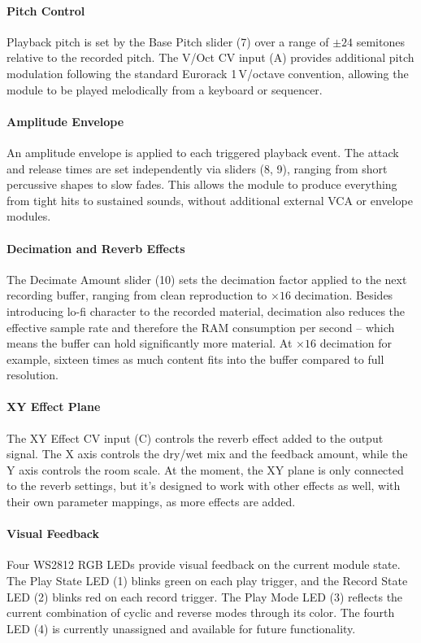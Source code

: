 \paragraph{Pitch Control}
Playback pitch is set by the Base Pitch slider (7) over a range of $\pm24$ semitones relative to the recorded pitch. 
The V/Oct CV input (A) provides additional pitch modulation following the standard Eurorack 1\,V/octave convention, allowing the module to be played melodically from a keyboard or sequencer.

\paragraph{Amplitude Envelope}
An amplitude envelope is applied to each triggered playback event. 
The attack and release times are set independently via sliders (8, 9), ranging from short percussive shapes to slow fades. 
This allows the module to produce everything from tight hits to sustained sounds, without additional external \ac{VCA} or envelope modules.

\paragraph{Decimation and Reverb Effects}
The Decimate Amount slider (10) sets the decimation factor applied to the next recording buffer, ranging from clean reproduction to $\times16$ decimation.
Besides introducing lo-fi character to the recorded material, decimation also reduces the effective sample rate and therefore the RAM consumption per second -- which means the buffer can hold significantly more material. 
At $\times16$ decimation for example, sixteen times as much content fits into the buffer compared to full resolution.

\paragraph{XY Effect Plane}
The XY Effect CV input (C) controls the reverb effect added to the output signal. The X axis controls the dry/wet mix and the feedback amount, while the Y axis controls the room scale. At the moment, the XY plane is only connected to the reverb settings, but it's designed to work with other effects as well, with their own parameter mappings, as more effects are added.

\paragraph{Visual Feedback}
Four WS2812 RGB LEDs provide visual feedback on the current module state. 
The Play State LED (1) blinks green on each play trigger, and the Record State LED (2) blinks red on each record trigger. 
The Play Mode LED (3) reflects the current combination of cyclic and reverse modes through its color. 
The fourth LED (4) is currently unassigned and available for future functionality.

